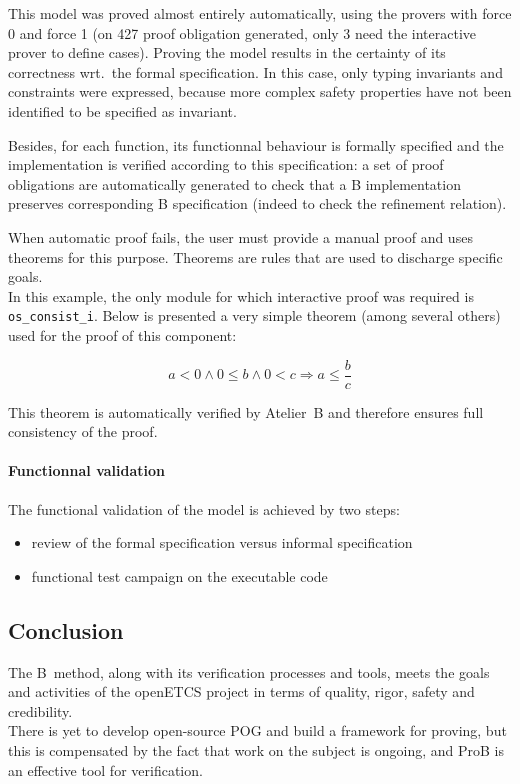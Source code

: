 This model was proved almost entirely automatically, using the provers with
force 0 and force 1 (on 427 proof obligation generated, only 3 need the
interactive prover to define cases). Proving the model results in the certainty
of its correctness wrt.\ the formal specification. In this case, only typing
invariants and constraints were expressed, because more complex safety
properties have not been identified to be specified as invariant. 

Besides, for each function, its functionnal behaviour is formally specified and the implementation is verified according to this specification: a set of proof obligations are automatically generated to check that a B implementation preserves corresponding B specification (indeed to check the refinement relation).

When automatic proof fails, the user must provide a manual proof and uses theorems for this purpose. Theorems are rules that are used to discharge specific goals.\\
In this example, the only module for which interactive proof was required is \verb+os_consist_i+. Below is presented a very simple theorem (among several others) used for the proof of this component:

\begin{equation}
\tag{User theory 1}
a < 0 \land 0 \leq b \land 0 < c \Rightarrow a \leq \frac{b}{c}
\end{equation}

This theorem is automatically verified by Atelier~B and therefore ensures full consistency of the proof.

\paragraph{Functionnal validation}

The functional validation of the model is achieved by two steps:
\begin{itemize}
\item review of the formal specification versus informal specification
\item functional test campaign on the executable code
\end{itemize}

\subsection{Conclusion}
The B~method, along with its verification processes and tools, meets the goals and activities of the openETCS project in terms of quality, rigor, safety and credibility.\\
There is yet to develop open-source POG and build a framework for proving, but this is compensated by the fact that work on the subject is ongoing, and ProB is an effective tool for verification.

